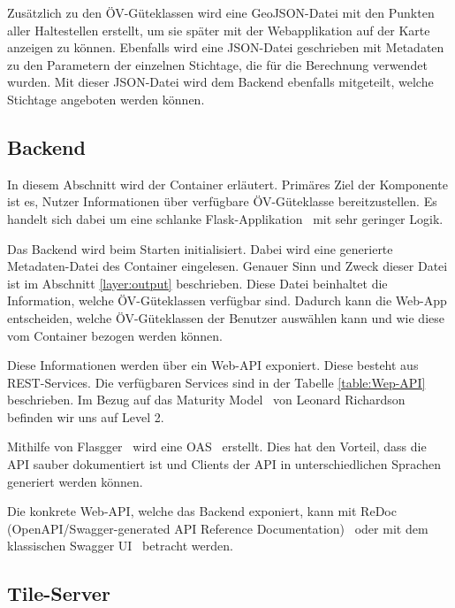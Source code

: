 Zusätzlich zu den \acs{ÖV}-Güteklassen wird eine GeoJSON-Datei mit den Punkten aller Haltestellen erstellt, um sie später mit der Webapplikation auf der Karte anzeigen zu können.
Ebenfalls wird eine JSON-Datei geschrieben mit Metadaten zu den Parametern der einzelnen Stichtage, die für die Berechnung verwendet wurden.
Mit dieser JSON-Datei wird dem Backend ebenfalls mitgeteilt, welche Stichtage angeboten werden können.

\subsection{Backend}
\label{Implementation:Backend}

In diesem Abschnitt wird der Container  erläutert.
Primäres Ziel der Komponente ist es, Nutzer Informationen über verfügbare \acs{ÖV}-Güteklasse bereitzustellen.
Es handelt sich dabei um eine schlanke Flask-Applikation~\cite{flask} mit sehr geringer Logik.

Das Backend wird beim Starten initialisiert.
Dabei wird eine generierte Metadaten-Datei des Container  eingelesen.
Genauer Sinn und Zweck dieser Datei ist im Abschnitt \ref{layer:output} beschrieben.
Diese Datei beinhaltet die Information, welche \acs{ÖV}-Güteklassen verfügbar sind.
Dadurch kann die Web-App entscheiden, welche \acs{ÖV}-Güteklassen der Benutzer auswählen kann und wie diese vom Container  bezogen werden können.

Diese Informationen werden über ein Web-\ac{API} exponiert.
Diese besteht aus \acl{REST}-Services.
Die verfügbaren Services sind in der Tabelle \ref{table:Wep-API} beschrieben.
Im Bezug auf das Maturity Model~\cite{maturity_model} von Leonard Richardson befinden wir uns auf Level 2.

Mithilfe von Flasgger~\cite{flasgger} wird eine \ac{OAS}~\cite{open-api-specificaiton} erstellt.
Dies hat den Vorteil, dass die \ac{API} sauber dokumentiert ist und Clients der \ac{API} in unterschiedlichen Sprachen generiert werden können.

Die konkrete Web-\ac{API}, welche das Backend exponiert, kann mit ReDoc (OpenAPI/Swagger-generated API Reference Documentation)~\cite{oevgk18-backend-api-spec} oder mit dem klassischen Swagger UI~\cite{oevgk18-backend-api-swaggerui} betracht werden.

\subsection{Tile-Server}
\label{Implementation:Tile-Server}

